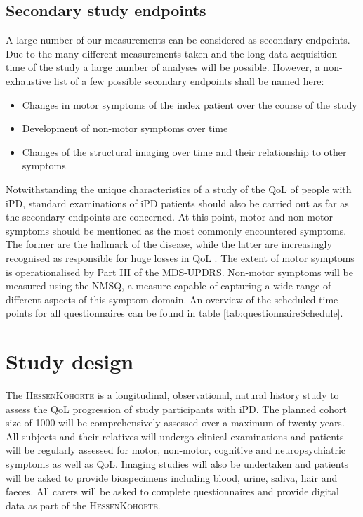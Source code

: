 \subsection{Secondary study endpoints}
A large number of our measurements can be considered as secondary endpoints. Due to the many different  measurements taken and the long data acquisition time of the study a large number of analyses will be possible. However, a non-exhaustive list of a few possible secondary endpoints shall be named here:
\begin{itemize}[noitemsep,topsep=0pt]
  \item{Changes in motor symptoms of the index patient over the course of the study}
  \item{Development of non-motor symptoms over time}
  \item{Changes of the structural imaging over time and their relationship
        to other symptoms} 
\end{itemize}
Notwithstanding the unique characteristics of a study of the \ac{QoL} of people with \ac{iPD}, standard examinations of \ac{iPD} patients should also be carried out as far as the secondary endpoints are concerned. At this point, motor and non-motor symptoms should be mentioned as the most commonly encountered symptoms. The former are the hallmark of the disease, while the latter are increasingly recognised as responsible for huge losses in \ac{QoL} \citep{klietz2020qol}. The extent of motor symptoms is operationalised by Part III of the \ac{MDS-UPDRS}\cite{goetz2007updrs}. Non-motor symptoms will be measured using the \ac{NMSQ}, a measure capable of capturing a wide range of different aspects of this symptom domain. An overview of the scheduled time points for all questionnaires can be found in table \ref{tab:questionnaireSchedule}.

\section{Study design}
The \textsc{HessenKohorte} is a longitudinal, observational, natural history study to assess the \ac{QoL} progression of study participants with \ac{iPD}. The planned cohort size of \num[round-precision = 0, round-mode = places]{1000}{} will be comprehensively assessed over a maximum of twenty years. All subjects and their relatives will undergo clinical examinations and patients will be regularly assessed for motor, non-motor, cognitive and neuropsychiatric symptoms as well as \ac{QoL}. Imaging studies will also be undertaken and patients will be asked to provide biospecimens including blood, urine, saliva, hair and faeces. All carers will be asked to complete questionnaires and provide digital data as part of the \textsc{HessenKohorte}.

